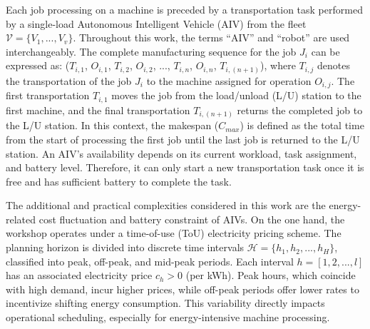 \documentclass[preprint, 3p, review, 12pt]{elsarticle}
\begin{document}
Each job processing on a machine is preceded by a transportation task performed by a single-load Autonomous Intelligent Vehicle (AIV) from the fleet $\mathcal{V}=\{ V_1, ..., V_v \}$. Throughout this work, the terms “AIV” and “robot” are used interchangeably. The complete manufacturing sequence for the job $J_i$ can be expressed as: ($T_{i,1}$, $O_{i,1}$, $T_{i,2}$, $O_{i,2}$, ..., $T_{i,n}$, $O_{i,n}$, $T_{i,(n+1)}$), where $T_{i,j}$ denotes the transportation of the job $J_i$ to the machine assigned for operation $O_{i,j}$. The first transportation $T_{i,1}$ moves the job from the load/unload (L/U) station to the first machine, and the final transportation $T_{i,(n+1)}$ returns the completed job to the L/U station. In this context, the makespan ($C_{max}$) is defined as the total time from the start of processing the first job until the last job is returned to the L/U station. An AIV's availability depends on its current workload, task assignment, and battery level. Therefore, it can only start a new transportation task once it is free and has sufficient battery to complete the task. 

The additional and practical complexities considered in this work are the energy-related cost fluctuation and battery constraint of AIVs. On the one hand, the workshop operates under a time-of-use (ToU) electricity pricing scheme. The planning horizon is divided into discrete time intervals 
$\mathcal{H} = \{h_1, h_2, ..., h_H\}$, classified into peak, off-peak, and mid-peak periods. Each interval $h = [1, 2, ..., l]$ has an associated electricity price $c_h > 0$ (per kWh). Peak hours, which coincide with high demand, incur higher prices, while off-peak periods offer lower rates to incentivize shifting energy consumption. This variability directly impacts operational scheduling, especially for energy-intensive machine processing.
\end{document}
